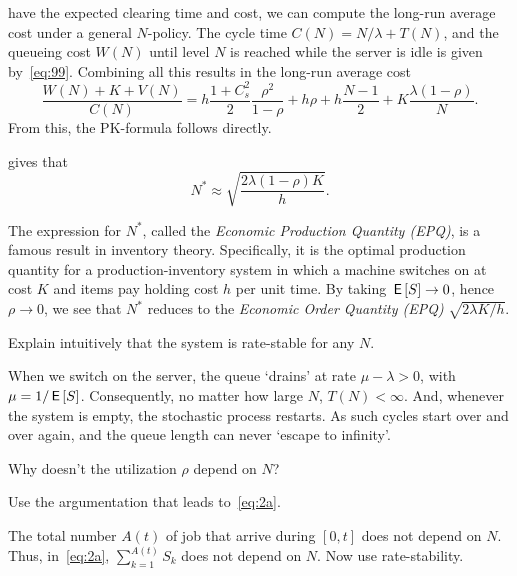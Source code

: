  have the expected clearing time and cost, we can compute the long-run average cost under a general $N$-policy.
The cycle time $C(N) = N/\lambda + T(N)$, and the queueing cost $W(N)$ until level $N$ is reached while the server is idle is given by~\cref{eq:99}.
Combining all this results in the long-run average cost
\begin{equation}  \label{eq:100}
    \frac{W(N) + K + V(N)}{C(N)}
    = h \frac{1+ C_s^2}2 \frac{\rho^2}{1-\rho} + h \rho + h \frac{N-1}2 + K \frac{\lambda(1-\rho)}N.
\end{equation}
From this, the PK-formula follows directly.

 gives that
\begin{equation*}
  N^* \approx \sqrt{\frac{2\lambda(1-\rho)K}{h}}.
\end{equation*}

The expression for $N^*$, called the \emph{Economic Production Quantity (EPQ)}, is a famous result in inventory theory.
Specifically, it is the optimal production quantity for a production-inventory system in which a machine switches on at cost $K$ and items pay holding cost $h$ per unit time.
By taking $\,\mathsf{E}\left[S\right] \to 0$, hence $\rho \to 0$, we see that $N^*$ reduces to the \emph{Economic Order Quantity (EPQ)} $\sqrt{2\lambda K/h}$.





\begin{exercise}
Explain intuitively that the system is rate-stable for any $N$.
\begin{solution}
  When we switch on the server, the queue `drains' at rate $\mu-\lambda>0$, with $\mu=1/\,\mathsf{E}\left[S\right]$.
  Consequently, no matter how large $N$, $T(N)<\infty$.
  And, whenever the system is empty, the stochastic process restarts.
  As such cycles start over and over again, and the queue length can never `escape to infinity'.
\end{solution}
\end{exercise}


\begin{exercise}
  Why doesn't  the utilization $\rho$ depend on $N$?
\begin{hint}
 Use the argumentation that leads to~\cref{eq:2a}.
\end{hint}
\begin{solution}
  The total number $A(t)$ of job that arrive during $[0,t]$ does not depend on $N$.
  Thus, in~\cref{eq:2a}, $\sum_{k=1}^{A(t)}S_k$ does not depend on $N$.
  Now use rate-stability.
\end{solution}
\end{exercise}

